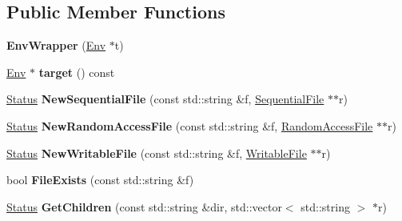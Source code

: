\subsection*{Public Member Functions}
\begin{DoxyCompactItemize}
\item 
\mbox{\label{classleveldb_1_1_env_wrapper_a724d3740db2663034c8974c0378e49cb}} 
{\bfseries Env\+Wrapper} (\mbox{\hyperlink{classleveldb_1_1_env}{Env}} $\ast$t)
\item 
\mbox{\label{classleveldb_1_1_env_wrapper_ac9bdbc7110de3bdbc42c04ca65f68de6}} 
\mbox{\hyperlink{classleveldb_1_1_env}{Env}} $\ast$ {\bfseries target} () const
\item 
\mbox{\label{classleveldb_1_1_env_wrapper_acd23f5803f7841cfcee9a29ffc1c5b04}} 
\mbox{\hyperlink{classleveldb_1_1_status}{Status}} {\bfseries New\+Sequential\+File} (const std\+::string \&f, \mbox{\hyperlink{classleveldb_1_1_sequential_file}{Sequential\+File}} $\ast$$\ast$r)
\item 
\mbox{\label{classleveldb_1_1_env_wrapper_ab8c78959e0d52f3c1beeeffc11ca0a34}} 
\mbox{\hyperlink{classleveldb_1_1_status}{Status}} {\bfseries New\+Random\+Access\+File} (const std\+::string \&f, \mbox{\hyperlink{classleveldb_1_1_random_access_file}{Random\+Access\+File}} $\ast$$\ast$r)
\item 
\mbox{\label{classleveldb_1_1_env_wrapper_a2d2b29a658e80c326ddaeb9c4d74c483}} 
\mbox{\hyperlink{classleveldb_1_1_status}{Status}} {\bfseries New\+Writable\+File} (const std\+::string \&f, \mbox{\hyperlink{classleveldb_1_1_writable_file}{Writable\+File}} $\ast$$\ast$r)
\item 
\mbox{\label{classleveldb_1_1_env_wrapper_ac72ceac6f4e2a6140e2835b2fa15f4df}} 
bool {\bfseries File\+Exists} (const std\+::string \&f)
\item 
\mbox{\label{classleveldb_1_1_env_wrapper_abb7c1fd7d91c80b6efcf9967154a18f3}} 
\mbox{\hyperlink{classleveldb_1_1_status}{Status}} {\bfseries Get\+Children} (const std\+::string \&dir, std\+::vector$<$ std\+::string $>$ $\ast$r)
$$
\end{DoxyCompactItemize}
